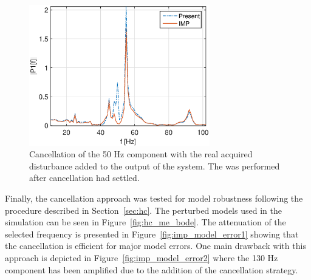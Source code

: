 \begin{figure}[h!]
  \centering
  \includegraphics[width=0.7\textwidth]{fig/matlab/distrej_realstep_fft.eps}
  \caption{\label{fig:imp_realdata} Cancellation of the 50 Hz component with the real acquired disturbance added to the output of the system. The \abbrFFT was performed after cancellation had settled.}
\end{figure}

\newpage
\FloatBarrier
Finally, the cancellation approach was tested for model robustness following the procedure described in Section~\ref{sec:hc}. The perturbed models used in the simulation can be seen in Figure~\ref{fig:hc_me_bode}. The attenuation of the selected frequency is presented in Figure~\ref{fig:imp_model_error1} showing that the cancellation is efficient for major model errors. One main drawback with this approach is depicted in Figure~\ref{fig:imp_model_error2} where the 130 Hz component has been amplified due to the addition of the \abbrIMP cancellation strategy.


